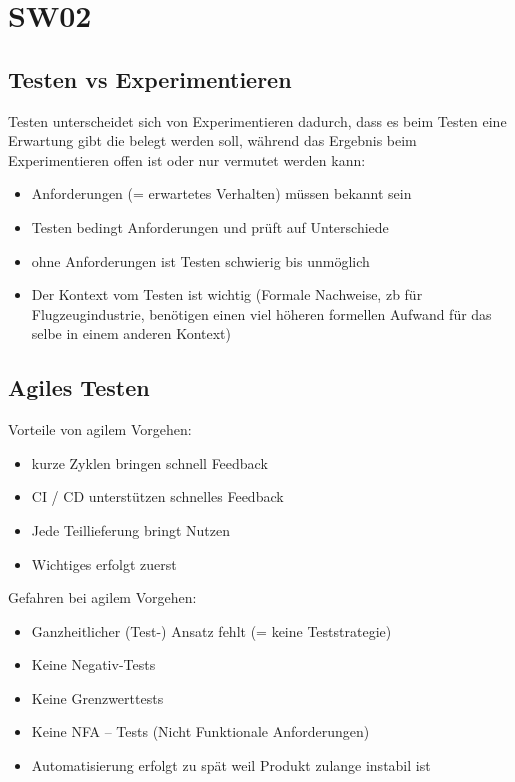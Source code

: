 \section{SW02}


\subsection{Testen vs Experimentieren}

Testen unterscheidet sich von Experimentieren dadurch, dass es beim Testen eine Erwartung gibt die belegt werden soll, während das Ergebnis beim Experimentieren offen ist oder nur vermutet werden kann:
\begin{itemize}
    \item Anforderungen (= erwartetes Verhalten) müssen bekannt sein
    \item Testen bedingt Anforderungen und prüft auf Unterschiede
    \item ohne Anforderungen ist Testen schwierig bis unmöglich
    \item Der Kontext vom Testen ist wichtig (Formale Nachweise, zb für Flugzeugindustrie, benötigen einen viel höheren formellen Aufwand für das selbe in einem anderen Kontext)
\end{itemize}

\subsection{Agiles Testen}

Vorteile von agilem Vorgehen:
\begin{itemize}
    \item kurze Zyklen bringen schnell Feedback
    \item CI / CD unterstützen schnelles Feedback
    \item Jede Teillieferung bringt Nutzen
    \item Wichtiges erfolgt zuerst
\end{itemize}

Gefahren bei agilem Vorgehen:
\begin{itemize}
    \item Ganzheitlicher (Test-) Ansatz fehlt (= keine Teststrategie)
    \item Keine Negativ-Tests
    \item Keine Grenzwerttests
    \item Keine NFA – Tests (Nicht Funktionale Anforderungen)
    \item Automatisierung erfolgt zu spät weil Produkt zulange instabil ist
\end{itemize}

